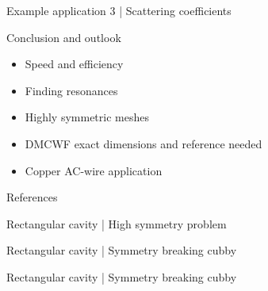 \documentclass{beamer}
\begin{document}
\begin{frame}{Example application 3 | Scattering coefficients}

    \begin{figure}
        \centering
        \scalebox{0.8}{}
    \end{figure}

\end{frame}

\begin{frame}{Conclusion and outlook}

    \begin{itemize}
        \item<1-> Speed and efficiency
        \item<2-> Finding resonances
        \item<3-> Highly symmetric meshes
        \item<4-> DMCWF exact dimensions and reference needed
        \item<5-> Copper AC-wire application
    \end{itemize}

\end{frame}

\begin{frame}{References}
    
\end{frame}

\begin{frame}{Rectangular cavity | High symmetry problem}
    \begin{figure}
        \centering
        \scalebox{0.8}{}
    \end{figure}
\end{frame}

\begin{frame}{Rectangular cavity | Symmetry breaking cubby}
    \begin{figure}
        \centering
        \scalebox{0.8}{}
    \end{figure}
\end{frame}

\begin{frame}{Rectangular cavity | Symmetry breaking cubby}
    \begin{figure}
        \centering
        \scalebox{0.8}{}
    \end{figure}
\end{frame}
\end{document}
